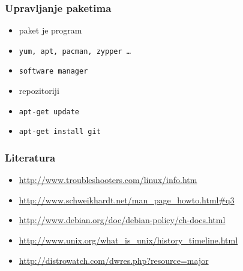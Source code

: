 \documentclass{beamer}
\begin{document}
\begin{frame}[t]
\frametitle{Upravljanje paketima}
\begin{itemize}
  \item paket je program
  \item \texttt{yum, apt, pacman, zypper \ldots}
  \item \texttt{software manager}
  \item repozitoriji
  \item \texttt{apt-get update}
  \item \texttt{apt-get install git}
\end{itemize}
\end{frame}

\begin{frame}[t]
\frametitle{Literatura}
\begin{itemize}
  \item \url{http://www.troubleshooters.com/linux/info.htm}
  \item \url{http://www.schweikhardt.net/man_page_howto.html\#q3}
  \item \url{http://www.debian.org/doc/debian-policy/ch-docs.html}
  \item \url{http://www.unix.org/what_is_unix/history_timeline.html}
  \item \url{http://distrowatch.com/dwres.php?resource=major}
\end{itemize}
\end{frame}
\end{document}
